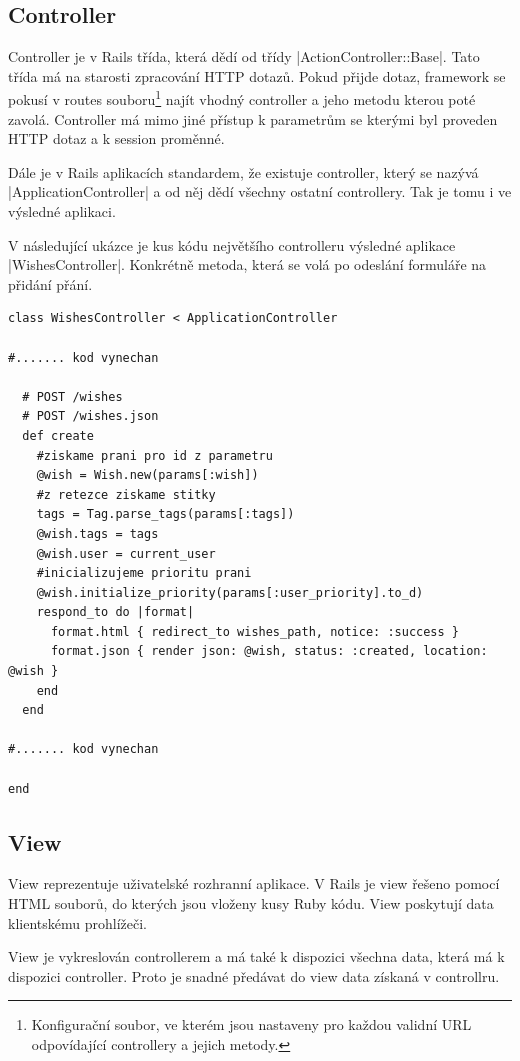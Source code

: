 \subsection{Controller}
Controller je v Rails třída, která dědí od třídy |ActionController::Base|. Tato třída má na starosti zpracování HTTP dotazů. Pokud přijde dotaz, framework se pokusí v routes souboru\footnote{Konfigurační soubor, ve kterém jsou nastaveny pro každou validní URL odpovídající controllery a jejich metody.} najít vhodný controller a jeho metodu kterou poté zavolá. Controller má mimo jiné přístup k parametrům se kterými byl proveden HTTP dotaz a k session proměnné.

Dále je v Rails aplikacích standardem, že existuje controller, který se nazývá |ApplicationController| a od něj dědí všechny ostatní controllery. Tak je tomu i ve výsledné aplikaci.

V následující ukázce je kus kódu největšího controlleru výsledné aplikace |WishesController|. Konkrétně metoda, která se volá po odeslání formuláře na přidání přání.

\lstset{language = ruby, style=custom}
\begin{lstlisting}
class WishesController < ApplicationController

#....... kod vynechan

  # POST /wishes
  # POST /wishes.json
  def create
    #ziskame prani pro id z parametru
    @wish = Wish.new(params[:wish])
    #z retezce ziskame stitky
    tags = Tag.parse_tags(params[:tags])
    @wish.tags = tags
    @wish.user = current_user
    #inicializujeme prioritu prani
    @wish.initialize_priority(params[:user_priority].to_d)
    respond_to do |format|
      format.html { redirect_to wishes_path, notice: :success }
      format.json { render json: @wish, status: :created, location: @wish }
    end
  end

#....... kod vynechan

end
\end{lstlisting}

\subsection{View}
View reprezentuje uživatelské rozhranní aplikace. V Rails je view řešeno pomocí HTML souborů, do kterých jsou vloženy kusy Ruby kódu. View poskytují data klientskému prohlížeči.

View je vykreslován controllerem a má také k dispozici všechna data, která má k dispozici controller. Proto je snadné předávat do view data získaná v controllru.

